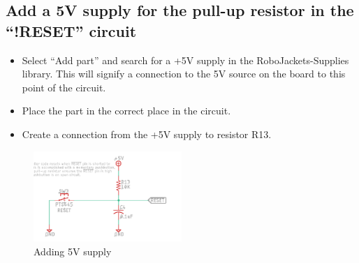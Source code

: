 \documentclass{article}
\begin{document}
\subsection{Add a 5V supply for the pull-up resistor in the “!RESET” circuit}
\begin{itemize}
    \item Select “Add part” and search for a +5V supply in the RoboJackets-Supplies library. This will signify a connection to the 5V source on the board to this point of the circuit.
    \item Place the part in the correct place in the circuit.
    \item Create a connection from the +5V supply to resistor R13.
\end{itemize}
\begin{figure}[ht]
	\center
	\includegraphics[width=0.5\textwidth, keepaspectratio]{images/5.3.png}
	\caption{Adding 5V supply}
	\label{fig:5.3}
\end{figure}
\end{document}
